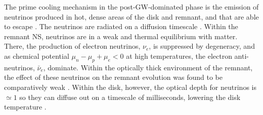 The prime cooling mechanism in the post-\ac{GW}-dominated phase is the emission of 
neutrinos produced in hot, dense areas of the disk and remnant, and that are 
able to escape \citep{Eichler:1989ve,Rosswog:2003rv,Sekiguchi:2011zd}. 
The neutrinos are radiated on a diffusion timescale \citep{Perego:2014fma}.
%
%
Within the remnant \ac{NS}, neutrinos are in a weak and thermal equilibrium with matter. 
There, the production of electron neutrinos, $\nu_e$,
is suppressed by degeneracy, and as chemical potential $\mu_n-\mu_p+\mu_e<0$ at high temperatures, 
the electron anti-neutrinos, $\bar{\nu}_{e}$, dominate. 
Within the optically thick environment of the remnant, the effect of these neutrinos 
on the remnant evolution was found to be comparatively weak 
\citep{Foucart:2015gaa,Perego:2019adq}.
%
Within the disk, however, the optical depth for neutrinos is ${\simeq}1$ so 
they can diffuse out on a timescale of milliseconds, lowering the disk 
temperature 
\citep{Beloborodov:2008nx}.


